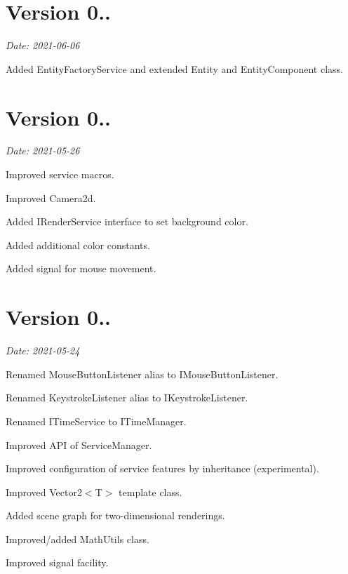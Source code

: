 \section*{Version 0..}

{\itshape Date\+: 2021-\/06-\/06}
\begin{DoxyItemize}
\item Added {\ttfamily Entity\+Factory\+Service} and extended {\ttfamily Entity} and {\ttfamily Entity\+Component} class.
\end{DoxyItemize}

\section*{Version 0..}

{\itshape Date\+: 2021-\/05-\/26}


\begin{DoxyItemize}
\item Improved service macros.
\item Improved Camera2d.
\item Added {\ttfamily I\+Render\+Service} interface to set background color.
\item Added additional color constants.
\item Added signal for mouse movement.
\end{DoxyItemize}

\section*{Version 0..}

{\itshape Date\+: 2021-\/05-\/24}


\begin{DoxyItemize}
\item Renamed {\ttfamily Mouse\+Button\+Listener} alias to {\ttfamily I\+Mouse\+Button\+Listener}.
\item Renamed {\ttfamily Keystroke\+Listener} alias to {\ttfamily I\+Keystroke\+Listener}.
\item Renamed {\ttfamily I\+Time\+Service} to {\ttfamily I\+Time\+Manager}.
\item Improved A\+PI of {\ttfamily Service\+Manager}.
\item Improved configuration of service features by inheritance (experimental).
\item Improved {\ttfamily Vector2$<$T$>$} template class.
\item Added scene graph for two-\/dimensional renderings.
\item Improved/added {\ttfamily Math\+Utils} class.
\item Improved signal facility.
\end{DoxyItemize}

